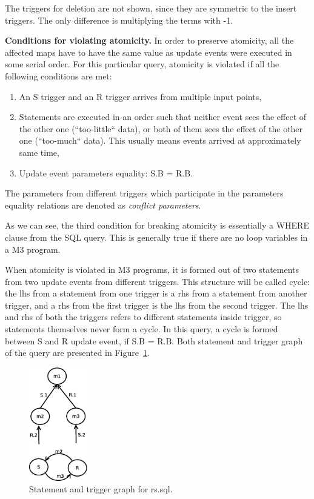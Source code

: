 \documentclass{sig-semester}
\begin{document}
The triggers for deletion are not shown, since they are symmetric to the insert triggers. The only difference is multiplying the terms with -1.

\textbf{Conditions for violating atomicity.} In order to preserve atomicity, all the affected maps have to have the same value as update events were executed in some serial order. For this particular query, atomicity is violated if all the following conditions are met:
\begin{enumerate}[(1)]
 \item An S trigger and an R trigger arrives from multiple input points,
 \item Statements are executed in an order such that neither event sees the effect of the other one (``too-little`` data), or both of them sees the effect of the other one (``too-much`` data). This usually means events arrived at approximately same time,
 \item Update event parameters equality: S.B = R.B.
\end{enumerate}

The parameters from different triggers which participate in the parameters equality relations are denoted as \textit{conflict parameters}.

As we can see, the third condition for breaking atomicity is essentially a WHERE clause from the SQL query. This is generally true if there are no loop variables in a M3 program.

When atomicity is violated in M3 programs, it is formed out of two statements from two update events from different triggers. This structure will be called cycle: the lhs from a statement from one trigger is a rhs from a statement from another trigger, and a rhs from the first trigger is the lhs from the second trigger. The lhs and rhs of both the triggers refers to different statements inside trigger, so statements themselves never form a cycle. In this query, a cycle is formed between S and R update event, if S.B = R.B. Both statement and trigger graph of the query are presented in Figure~\ref{fig:rs}.

\begin{figure}[!t]
\centering
\includegraphics[width=1in]{rs.eps}
\vspace{-3mm}
\caption{Statement and trigger graph for rs.sql.}
\label{fig:rs}
\vspace{-2mm}
\end{figure}
\end{document}
